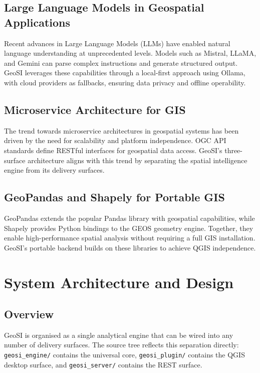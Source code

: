 \documentclass[12pt,a4paper]{report}
\begin{document}
\section{Large Language Models in Geospatial Applications}

Recent advances in Large Language Models (LLMs) have enabled natural language understanding at unprecedented levels.  Models such as Mistral, LLaMA, and Gemini can parse complex instructions and generate structured output.  GeoSI leverages these capabilities through a local-first approach using Ollama, with cloud providers as fallbacks, ensuring data privacy and offline operability.

\section{Microservice Architecture for GIS}

The trend towards microservice architectures in geospatial systems has been driven by the need for scalability and platform independence.  OGC API standards define RESTful interfaces for geospatial data access.  GeoSI's three-surface architecture aligns with this trend by separating the spatial intelligence engine from its delivery surfaces.

\section{GeoPandas and Shapely for Portable GIS}

GeoPandas extends the popular Pandas library with geospatial capabilities, while Shapely provides Python bindings to the GEOS geometry engine.  Together, they enable high-performance spatial analysis without requiring a full GIS installation.  GeoSI's portable backend builds on these libraries to achieve QGIS independence.

\chapter{System Architecture and Design}

\section{Overview}

GeoSI is organised as a single analytical engine that can be wired into any number of delivery surfaces.  The source tree reflects this separation directly: \texttt{geosi\_engine/} contains the universal core, \texttt{geosi\_plugin/} contains the QGIS desktop surface, and \texttt{geosi\_server/} contains the REST surface.
\end{document}
